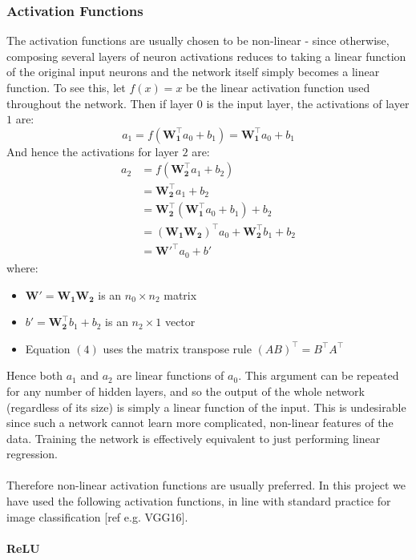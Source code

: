 \documentclass[11pt]{article} %
\theoremstyle{plain}
\theoremstyle{definition}
\begin{document}
\subsubsection{Activation Functions}
The activation functions are usually chosen to be non-linear - since otherwise, composing several layers of neuron activations reduces to taking a linear function of the original input neurons and the network itself simply becomes a linear function. To see this, let \(f(x) = x\) be the linear activation function used throughout the network. Then if layer \(0\) is the input layer, the activations of layer \(1\) are:
\[a_{1} = f(\mathbf{W_1^{\top}}a_0 + b_1) = \mathbf{W_1^{\top}}a_0 + b_1\]
And hence the activations for layer \(2\) are:
\begin{align}
a_{2} &= f(\mathbf{W_2^{\top}}a_1 + b_2)  \\
      &= \mathbf{W_2^{\top}}a_1 + b_2 \\
      &= \mathbf{W_2^{\top}}(\mathbf{W_1^{\top}}a_0 + b_1) + b_2 \\
      &= \mathbf{(W_1W_2)^{\top}}a_0 + \mathbf{W_2^{\top}}b_1 + b_2 \\
      &= \mathbf{W'^{\top}}a_0 + b' 
\end{align}
where:
\begin{itemize}
  \item \(\mathbf{W'} = \mathbf{W_1W_2}\)  is an \({n_0}\times{n_2}\) matrix
  \item \(b' = \mathbf{W_2^{\top}}b_1 + b_2\) is an \({n_2}\times{1}\) vector
  \item Equation \((4)\) uses the matrix transpose rule \((AB)^{\top} = B^{\top}A^{\top}\)
\end{itemize}
Hence both \(a_1\) and \(a_2\) are linear functions of \(a_0\). This argument can be repeated for any number of hidden layers, and so the output of the whole network (regardless of its size) is simply a linear function of the input. This is undesirable since such a network cannot learn more complicated, non-linear features of the data. Training the network is effectively equivalent to just performing linear regression.
\\
\\
\noindent
Therefore non-linear activation functions are usually preferred. In this project we have used the following activation functions, in line with standard practice for image classification [ref e.g. VGG16].
\\
\\
\noindent
\textbf{ReLU}
\\
\end{document}
